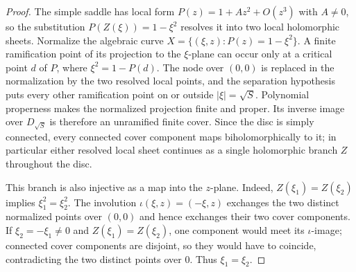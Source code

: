 \begin{proof}
The simple saddle has local form $P(z)=1+Az^2+O(z^3)$ with $A\ne0$, so the
substitution $P(Z(\xi))=1-\xi^2$ resolves it into two local holomorphic
sheets.  Normalize the algebraic curve
$X=\{(\xi,z):P(z)=1-\xi^2\}$.  A finite ramification point of its projection
to the $\xi$-plane can occur only at a critical point $d$ of $P$, where
$\xi^2=1-P(d)$.  The node over $(0,0)$ is replaced in the normalization by
the two resolved local points, and the separation hypothesis puts every
other ramification point on or outside $|\xi|=\sqrt S$.  Polynomial
properness makes the normalized projection finite and proper.  Its inverse
image over $D_{\sqrt S}$ is therefore an unramified finite cover.  Since the
disc is simply connected, every connected cover component maps
biholomorphically to it; in particular either resolved local sheet continues
as a single holomorphic branch $Z$ throughout the disc.

This branch is also injective as a map into the $z$-plane.  Indeed,
$Z(\xi_1)=Z(\xi_2)$ implies $\xi_1^2=\xi_2^2$.  The involution
$\iota(\xi,z)=(-\xi,z)$ exchanges the two distinct normalized points over
$(0,0)$ and hence exchanges their two cover components.  If
$\xi_2=-\xi_1\ne0$ and $Z(\xi_1)=Z(\xi_2)$, one component would meet its
$\iota$-image; connected cover components are disjoint, so they would have to
coincide, contradicting the two distinct points over $0$.  Thus
$\xi_1=\xi_2$.


\end{proof}
